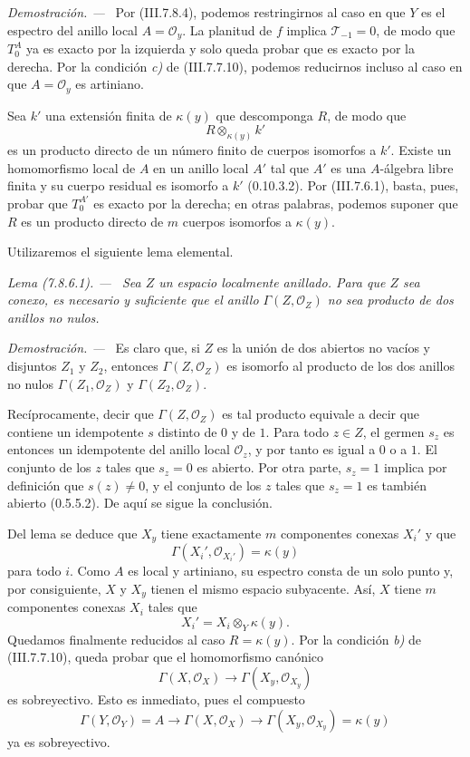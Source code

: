 \documentclass[10pt,oneside]{book}
\newcommand{\kres}{\kappa}
\newcommand{\sref}[2][]{\textup{(#2)}}
\newcommand{\oldpage}[2][]{\setcounter{footnote}{0}\marginpar{\scriptsize\textbf{#1}~|~#2}\ignorespaces}
\newenvironment{lemma}[1][]{\par\medskip\noindent\itshape Lema (#1). ---\ }{\par}
\newenvironment{proof}{\par\medskip\noindent\textit{Demostración. ---\ }}{\par}
\begin{document}
\begin{proof}
Por \sref{III.7.8.4}, podemos restringirnos al caso en que $Y$ es
el espectro del anillo local $A=\mathscr O_y$. La planitud de $f$
implica $\mathscr T_{-1}=0$, de modo que $T_0^A$ ya es exacto por la
izquierda y solo queda probar que es exacto por la derecha. Por la
condición \emph{c)} de \sref{III.7.7.10}, podemos reducirnos incluso al
caso en que $A=\mathscr O_y$ es artiniano.

Sea $k'$ una extensión finita de $\kres(y)$ que descomponga $R$, de
modo que
\[
  R\otimes_{\kres(y)}k'
\]
es un producto directo de un número finito de cuerpos isomorfos a
$k'$. Existe un homomorfismo local de $A$ en un anillo local $A'$
tal que $A'$ es una $A$-álgebra libre finita y su cuerpo residual es
isomorfo a $k'$ \sref[0]{0.10.3.2}. Por \sref{III.7.6.1}, basta,
pues, probar que $T_0^{A'}$ es exacto por la derecha; en otras
palabras, podemos suponer que $R$ es un producto directo de $m$
cuerpos isomorfos a $\kres(y)$.

Utilizaremos el siguiente lema elemental.

\begin{lemma}[7.8.6.1]
\label{III.7.8.6.1}
Sea $Z$ un espacio localmente anillado. Para que $Z$ sea conexo,
\oldpage[III]{207}
es necesario y suficiente que el anillo $\Gamma(Z,\mathscr O_Z)$
no sea producto de dos anillos no nulos.
\end{lemma}

\begin{proof}
Es claro que, si $Z$ es la unión de dos abiertos no vacíos y
disjuntos $Z_1$ y $Z_2$, entonces $\Gamma(Z,\mathscr O_Z)$ es
isomorfo al producto de los dos anillos no nulos
$\Gamma(Z_1,\mathscr O_Z)$ y $\Gamma(Z_2,\mathscr O_Z)$.

Recíprocamente, decir que $\Gamma(Z,\mathscr O_Z)$ es tal producto
equivale a decir que contiene un idempotente $s$ distinto de $0$ y
de $1$. Para todo $z\in Z$, el germen $s_z$ es entonces un
idempotente del anillo local $\mathscr O_z$, y por tanto es igual a
$0$ o a $1$. El conjunto de los $z$ tales que $s_z=0$ es abierto.
Por otra parte, $s_z=1$ implica por definición que $s(z)\ne0$, y el
conjunto de los $z$ tales que $s_z=1$ es también abierto
\sref[0]{0.5.5.2}. De aquí se sigue la conclusión.
\end{proof}

Del lema se deduce que $X_y$ tiene exactamente $m$ componentes
conexas $X_i'$ y que
\[
  \Gamma(X_i',\mathscr O_{X_i'})=\kres(y)
\]
para todo $i$. Como $A$ es local y artiniano, su espectro consta de
un solo punto y, por consiguiente, $X$ y $X_y$ tienen el mismo
espacio subyacente. Así, $X$ tiene $m$ componentes conexas $X_i$
tales que
\[
  X_i'=X_i\otimes_Y\kres(y).
\]
Quedamos finalmente reducidos al caso $R=\kres(y)$. Por la
condición \emph{b)} de \sref{III.7.7.10}, queda probar que el homomorfismo
canónico
\[
  \Gamma(X,\mathscr O_X)\longrightarrow
  \Gamma(X_y,\mathscr O_{X_y})
\]
es sobreyectivo. Esto es inmediato, pues el compuesto
\[
  \Gamma(Y,\mathscr O_Y)=A
  \longrightarrow\Gamma(X,\mathscr O_X)
  \longrightarrow\Gamma(X_y,\mathscr O_{X_y})=\kres(y)
\]
ya es sobreyectivo.
\end{proof}
\end{document}
